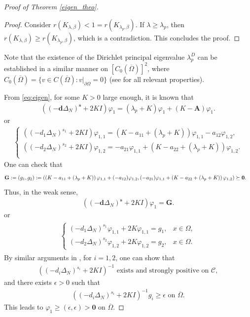 \documentclass[a4paper,11pt]{amsart}
\theoremstyle{definition}
\def\O{\Omega}
\numberwithin{equation}{section}
\theoremstyle{definition}
\def\O{\Omega}
\begin{document}
\begin{proof}[Proof of Theorem \ref{eigen_theo}]
\begin{proof}
Consider $r(K_{\lambda,\beta})<1=r(K_{\lambda_p,\beta})$. If $\lambda\geq \lambda_p$, then $r(K_{\lambda,\beta})\geq r(K_{\lambda_p,\beta})$, which is a contradiction. This concludes the proof.


\end{proof}

Note that the existence of the Dirichlet principal eigenvalue $\lambda^D_p$ can be established in a similar manner on $[C_0(\overline{\Omega})]^2$, 
where $C_0(\overline{\Omega})=\{v\in C(\overline{\Omega}):v|_{\partial \Omega}=0\}$ 
(see \cite[Theorem~3.1, Steps~1--3]{zhao_spatiotemporal_2025} for all relevant properties).



From \eqref{eq:eigen}, for some $K>0$ large enough, it is known that
\begin{align*}
((-\textbf{d}\Delta_N)^{\textbf{s}} + 2K I)\varphi_1=(\lambda_p+K)\varphi_1+(K-\textbf{A})\varphi_1.
\end{align*}
or
\begin{align*}
\left\{\begin{array}{llll}
((-d_1\Delta_N)^{s_1} + 2K I)\varphi_{1,1}=\left(K-a_{11}+(\lambda_p+K)\right)\varphi_{1,1}-a_{12}\varphi_{1,2},\\
((-d_2\Delta_N)^{s_2} + 2K I)\varphi_{1,2}=-a_{21}\varphi_{1,1}+\left(K-a_{22}+(\lambda_p+K)\right)\varphi_{1,2}.\\
\end{array}\right.
\end{align*}
One can check that
\begin{align*}
&\textbf{G}:=(g_1,g_2):=\left(\left(K-a_{11}+(\lambda_p+K)\right)\varphi_{1,1}+(-a_{12})\varphi_{1,2} ,(-a_{21})\varphi_{1,1}+\left(K-a_{22}+(\lambda_p+K)\right)\varphi_{1,2}\right)\succeq  {\bf 0}.
\end{align*}
Thus, in the weak sense,
\begin{align*}
((-\textbf{d}\Delta_N)^{\textbf{s}} + 2K I)\varphi_1=\textbf{G}.
\end{align*}
or 
\begin{align*}
\begin{split}
\left\{\begin{array}{lllll}
(-d_1\Delta_N)^{s_1}\varphi_{1,1}+2K\varphi_{1,1}=g_1,&x\in \O, \\
(-d_2\Delta_N)^{s_2}\varphi_{1,2}+2K\varphi_{1,2}=g_2,&x\in \O.
\end{array}\right.
\end{split}
\end{align*}
By similar arguments in \cite[Theorem 3.1, Step 3, Case 1]{zhao_spatiotemporal_2025}, for $i=1,2$, one can show that
\begin{align*}
((-d_i\Delta_N)^{s_i}+2KI)^{-1} \text{ exists and strongly positive on }\mathcal{C},
\end{align*}
and there exists $\epsilon>0$ such that
\begin{align*}
((-d_i\Delta_N)^{s_i}+2KI)^{-1}g_i\geq \epsilon\text{ on } \overline{\O}.
\end{align*}
This leads to $\varphi_{1}\geq (\epsilon,\epsilon)>\textbf{0}$ on $\overline{\O}$.


\end{proof}
\end{document}
